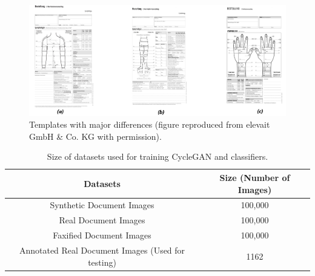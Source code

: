 \begin{figure}[H]
        \begin{center}
	    \includegraphics[scale=0.30]{images/Implementation/TemplatesWithMajorDifference.png}
	    \caption[Templates with major differences.]{Templates with major differences (figure reproduced from elevait GmbH \& Co. KG with permission).}
	    \label{fig:TemplatesWithMajorDifference}
	    \end{center}
\end{figure}








\begin{center}
    \begin{table}[H]
    \begin{center}
    \begin{tabular}{||c c||} 
    \hline
    \textbf{Datasets} & \textbf{Size (Number of Images)}\\ [0.5ex] 
    \hline\hline
    Synthetic Document Images & 100,000 \\ 
    \hline
    Real Document Images & 100,000 \\
    \hline
    Faxified Document Images & 100,000 \\
    \hline
    Annotated Real Document Images (Used for testing) & 1162 \\
    \hline
    \end{tabular}
    \end{center}
    \caption{Size of datasets used for training \ac{CycleGAN} and classifiers.}
    \label{table:datasets}
    \end{table}
\end{center}


